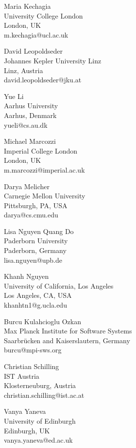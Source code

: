 \documentclass[a4paper,UKenglish]{dartsmaster-v2019}
\begin{document}
\begin{participants}
\participant Maria Kechagia\\
	University College London\\
	London, UK\\
	m.kechagia@ucl.ac.uk

\participant David Leopoldseder\\
	Johannes Kepler University Linz\\
	Linz, Austria\\
	david.leopoldseder@jku.at

\participant Yue Li\\
	Aarhus University\\
	Aarhus, Denmark\\
	yueli@cs.au.dk

\participant Michael Marcozzi\\
	Imperial College London\\
	London, UK\\
	m.marcozzi@imperial.ac.uk

\participant Darya Melicher\\
	Carnegie Mellon University\\
	Pittsburgh, PA, USA\\
	darya@cs.cmu.edu

\participant Lisa Nguyen Quang Do\\
	Paderborn University\\
	Paderborn, Germany\\
	lisa.nguyen@upb.de

\participant Khanh Nguyen\\
	University of California, Los Angeles\\
	Los Angeles, CA, USA\\
	khanhtn1@g.ucla.edu

\participant Burcu Kulahcioglu Ozkan\\
	Max Planck Institute for Software Systems\\
	Saarbrücken and Kaiserslautern, Germany\\
	burcu@mpi-sws.org

\participant Christian Schilling\\
	IST Austria\\
	Klosterneuburg, Austria\\
	christian.schilling@ist.ac.at

\participant Vanya Yaneva\\
	University of Edinburgh\\
	Edinburgh, UK\\
	vanya.yaneva@ed.ac.uk

\end{participants}
\end{document}
